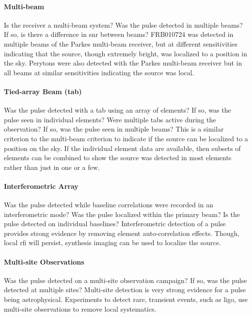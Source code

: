 \documentclass[a4paper,fleqn,usenatbib]{mnras}
\begin{document}
\paragraph{Multi-beam}

Is the receiver a multi-beam system? Was the pulse detected in multiple beams?
If so, is there a difference in \gls{snr} between beams? FRB010724
\citep{2007Sci...318..777L} was detected in multiple beams of the Parkes
multi-beam receiver, but at different sensitivities indicating that the source,
though extremely bright, was localized to a position in the sky. Perytons were
also detected with the Parkes multi-beam receiver but in all beams at similar
sensitivities indicating the source was local.

\paragraph{Tied-array Beam (\gls{tab})}

Was the pulse detected with a \gls{tab} using an array of elements? If so, was
the pulse seen in individual elements? Were multiple \glspl{tab} active during
the observation? If so, was the pulse seen in multiple beams? This is a similar
criterion to the multi-beam criterion to indicate if the source can be localized
to a position on the sky. If the individual element data are available, then
subsets of elements can be combined to show the source was detected in most
elements rather than just in one or a few.

\paragraph{Interferometric Array}

Was the pulse detected while baseline correlations were recorded in an
interferometric mode? Was the pulse localized within the primary beam? Is the
pulse detected on individual baselines? Interferometric detection of a pulse
provides strong evidence by removing element auto-correlation effects. Though,
local \gls{rfi} will persist, synthesis imaging can be used to localize the
source.

\paragraph{Multi-site Observations}

Was the pulse detected on a multi-site observation campaign? If so, was the
pulse detected at multiple sites? Multi-site detection is very strong evidence
for a pulse being astrophysical. Experiments to detect rare, transient events,
such as \gls{ligo}, use multi-site observations to remove local systematics.
\end{document}
